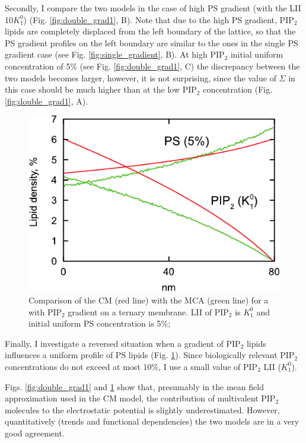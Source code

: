 Secondly, I compare the two models in the case of high PS gradient (with the LII 10$K_1^0$) (Fig. \ref{fig:double_grad1}, B). Note that due to the high PS gradient, PIP$_2$ lipids are completely displaced from the left boundary of the lattice, so that the PS gradient profiles on the left boundary are similar to the ones in the single PS gradient case (see Fig. \ref{fig:single_gradient}, B). At high PIP$_2$ initial uniform concentration of 5\% (see Fig. \ref{fig:double_grad1}, C) the discrepancy between the two models becomes larger, however, it is not surprising, since the value of $\Sigma$ in this case should be much higher than at the low PIP$_2$ concentration (Fig. \ref{fig:double_grad1}, A).
\begin{figure}[!ht]
\centering
  \includegraphics[scale=1.03]{../figures/double_grad2_half_lattice.pdf}

\caption[Comparison of CM with MCA for a ternary membrane with PIP$_2$ gradient]{Comparison of the CM (red line) with the MCA (green line) for a  with PIP$_2$ gradient on a ternary membrane. LII of PIP$_2$ is $K_1^0$ and initial uniform PS concentration is 5\%;}
\label{fig:double_grad2}
\end{figure}

Finally, I investigate a reversed situation when a gradient of PIP$_2$ lipids influences a uniform profile of PS lipids (Fig. \ref{fig:double_grad2}). Since biologically relevant PIP$_2$ concentrations do not exceed at most 10\%, I use a small value of PIP$_2$ LII ($K_1^0$).


Figs. \ref{fig:double_grad1} and \ref{fig:double_grad2} show that, presumably in the mean field approximation used in the CM model, the contribution of multivalent PIP$_2$ molecules to the electrostatic potential is slightly underestimated. However, quantitatively (trends and functional dependencies) the two models are in a very good agreement.

